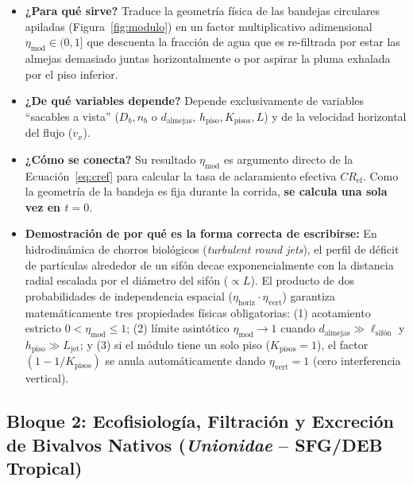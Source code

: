 \documentclass[11pt,letterpaper]{article}
\begin{document}
\begin{itemize}[leftmargin=1.5em]
    \item \textbf{¿Para qué sirve?} Traduce la geometría física de las bandejas circulares apiladas (Figura~\ref{fig:modulo}) en un factor multiplicativo adimensional $\eta_{\text{mod}} \in (0, 1]$ que descuenta la fracción de agua que es re-filtrada por estar las almejas demasiado juntas horizontalmente o por aspirar la pluma exhalada por el piso inferior.
    \item \textbf{¿De qué variables depende?} Depende exclusivamente de variables ``sacables a vista'' ($D_b, n_b$ o $d_{\text{almejas}}$, $h_{\text{piso}}, K_{\text{pisos}}, L$) y de la velocidad horizontal del flujo ($v_x$).
    \item \textbf{¿Cómo se conecta?} Su resultado $\eta_{\text{mod}}$ es argumento directo de la Ecuación~\eqref{eq:cref} para calcular la tasa de aclaramiento efectiva $CR_{\text{ef}}$. Como la geometría de la bandeja es fija durante la corrida, \textbf{se calcula una sola vez en $t=0$}.
    \item \textbf{Demostración de por qué es la forma correcta de escribirse:} En hidrodinámica de chorros biológicos (\textit{turbulent round jets}), el perfil de déficit de partículas alrededor de un sifón decae exponencialmente con la distancia radial escalada por el diámetro del sifón ($\propto L$). El producto de dos probabilidades de independencia espacial ($\eta_{\text{horiz}} \cdot \eta_{\text{vert}}$) garantiza matemáticamente tres propiedades físicas obligatorias: (1) acotamiento estricto $0 < \eta_{\text{mod}} \le 1$; (2) límite asintótico $\eta_{\text{mod}} \to 1$ cuando $d_{\text{almejas}} \gg \ell_{\text{sifón}}$ y $h_{\text{piso}} \gg L_{\text{jet}}$; y (3) si el módulo tiene un solo piso ($K_{\text{pisos}} = 1$), el factor $(1 - 1/K_{\text{pisos}})$ se anula automáticamente dando $\eta_{\text{vert}} = 1$ (cero interferencia vertical).
\end{itemize}

\subsection{Bloque 2: Ecofisiología, Filtración y Excreción de Bivalvos Nativos (\textit{Unionidae} -- SFG/DEB Tropical)}
\end{document}
